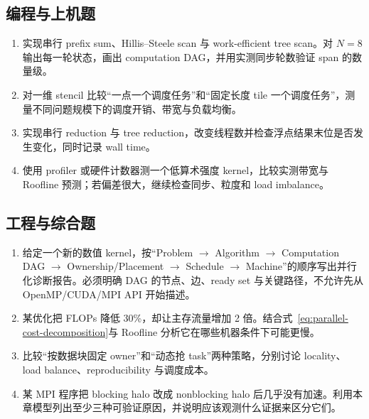 \subsection*{编程与上机题}
\begin{enumerate}[label=\arabic*.]
\item 实现串行 prefix sum、Hillis--Steele scan 与 work-efficient tree scan。对 $N=8$ 输出每一轮状态，画出 computation DAG，并用实测同步轮数验证 span 的数量级。
\item 对一维 stencil 比较“一点一个调度任务”和“固定长度 tile 一个调度任务”，测量不同问题规模下的调度开销、带宽与负载均衡。
\item 实现串行 reduction 与 tree reduction，改变线程数并检查浮点结果末位是否发生变化，同时记录 wall time。
\item 使用 profiler 或硬件计数器测一个低算术强度 kernel，比较实测带宽与 Roofline 预测；若偏差很大，继续检查同步、粒度和 load imbalance。
\end{enumerate}

\subsection*{工程与综合题}
\begin{enumerate}[label=\arabic*.]
\item 给定一个新的数值 kernel，按“Problem $\rightarrow$ Algorithm $\rightarrow$ Computation DAG $\rightarrow$ Ownership/Placement $\rightarrow$ Schedule $\rightarrow$ Machine”的顺序写出并行化诊断报告。必须明确 DAG 的节点、边、ready set 与关键路径，不允许先从 OpenMP/CUDA/MPI API 开始描述。
\item 某优化把 FLOPs 降低 30\%，却让主存流量增加 2 倍。结合式~\eqref{eq:parallel-cost-decomposition}与 Roofline 分析它在哪些机器条件下可能更慢。
\item 比较“按数据块固定 owner”和“动态抢 task”两种策略，分别讨论 locality、load balance、reproducibility 与调度成本。
\item 某 MPI 程序把 blocking halo 改成 nonblocking halo 后几乎没有加速。利用本章模型列出至少三种可验证原因，并说明应该观测什么证据来区分它们。
\end{enumerate}
